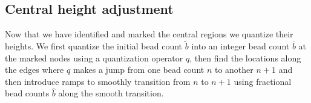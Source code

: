 \subsection{Central height adjustment}\label{sec_central_height_adjustment}
Now that we have identified and marked the central regions we quantize their heights.
We first quantize the initial bead count $\tilde{b}$ into an integer bead count $\bar{b}$ at the marked nodes using a quantization operator $q$,
then find the locations along the edges where $q$ makes a jump from one bead count $n$ to another $n+1$
and then introduce ramps to smoothly transition from $n$ to $n+1$ using fractional bead counts $\hat{b}$ along the smooth transition.



